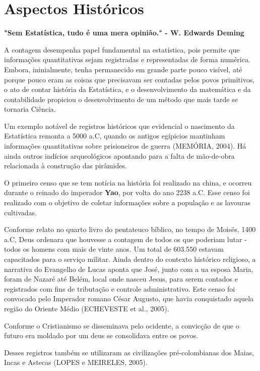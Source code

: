 \section{Aspectos Históricos}
 \textbf{"Sem Estatística, tudo é uma mera opinião."  - W. Edwards Deming} \vskip0.3cm


A contagem desempenha papel fundamental na estatística, pois permite que informações quantitativas sejam registradas e representadas de forma numérica. Embora, ininialmente, tenha permanecido em grande parte pouco visível, até porque pouco eram as coisas que precisavam ser contadas pelos povos primitivos, o ato de contar história da Estatística, e o desenvolvimento da matemática e da contabilidade propiciou o desenvolvimento de um método que mais tarde se tornaria Ciência.\vskip0.3cm

Um exemplo notável de registros históricos que evidencial o nascimento da Estatística remonta a 5000 a.C, quando os antigos egípicios mantinham informações quantitativas sobre prisioneiros de guerra (MEMÓRIA, 2004). Há ainda outros indícios arqueológicos apontando para a falta de mão-de-obra relacionada à construção das pirâmides.\vskip0.3cm

O primeiro censo que se tem notícia na história foi realizado na china, e ocorreu durante o reinado do imperador \textbf{Yao}, por volta do ano 2238 a.C. Esse censo foi realizado com o objetivo de coletar informações sobre a população e as lavouras cultivadas. \vskip0.3cm


Conforme relato no quarto livro do pentateuco bíblico, no tempo de Moisés, 1400 a.C, Deus ordenara que houvesse a contagem de todos os que poderiam lutar - todos os homens com mais de vinte anos. Um total de 603.550 estavam capacitados para o serviço militar. Ainda dentro do contexto histórico religioso, a narrativa do Evangelho de Lucas aponta que José, junto com a ua esposa Maria, foram de Nazaré até Belém, local onde nasceu Jesus, para serem contados e registrados com fins de tributação e controle administrativo. Este censo foi convocado pelo Imperador romano César Augusto, que havia conquistado aquela região do Oriente Médio (ECHEVESTE et al., 2005).
\vskip0.3cm

\newpage
Conforme o Cristianismo se disseminava pelo ocidente, a convicção de que o futuro era moldado por um deus se consolidava entre os povos.\vskip0.3cm

 
Desses registros também se utilizaram as civilizações pré-colombianas dos Maias, Incas e Astecas (LOPES e  MEIRELES, 2005).\vskip0.3cm


